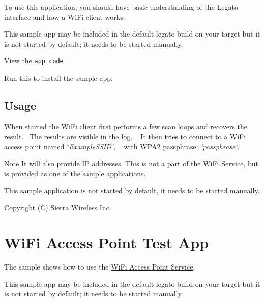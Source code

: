 To use this application, you should have basic understanding of the Legato interface and how a Wi\+Fi client works.

This sample app may be included in the default legato build on your target but it is not started by default; it needs to be started manually.

View the \href{https://github.com/legatoproject/legato-WiFi/tree/master/apps/sample/wifiClientTest}{\tt app code}

Run this to install the sample app\+: 
\hypertarget{wifi_wificlient_testapp_wifi_sample_Apps_wificlient_testapp_usage}{}\subsection{Usage}\label{wifi_wificlient_testapp_wifi_sample_Apps_wificlient_testapp_usage}
When started the Wi\+Fi client first performs a few scan loops and recovers the result.~\newline
 The results are visible in the log. ~\newline
 It then tries to connect to a Wi\+Fi access point named {\itshape \char`\"{}\+Example\+S\+S\+I\+D\char`\"{}}, ~\newline
 with W\+P\+A2 passphrase\+: {\itshape \char`\"{}passphrase\char`\"{}}. ~\newline


\begin{DoxyNote}{Note}
It will also provide IP addresses. This is not a part of the Wi\+Fi Service, but is provided as one of the sample applications.
\end{DoxyNote}
This sample application is not started by default, it needs to be started manually.

Copyright (C) Sierra Wireless Inc. \hypertarget{wifi_wifiap_testapp}{}\section{Wi\+Fi Access Point Test App}\label{wifi_wifiap_testapp}
The sample shows how to use the \hyperlink{c_le_wifi_ap}{Wi\+Fi Access Point Service}.

This sample app may be included in the default legato build on your target but it is not started by default; it needs to be started manually.

